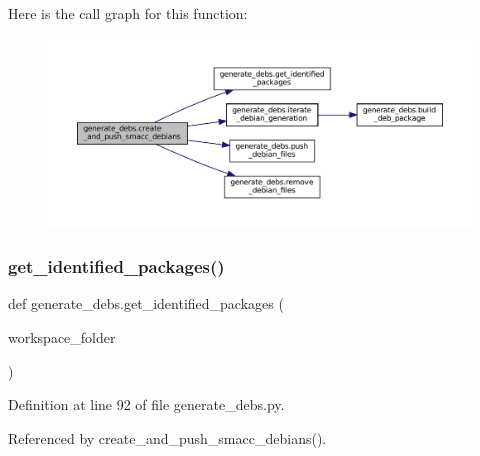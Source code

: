 Here is the call graph for this function\+:
\nopagebreak
\begin{figure}[H]
\begin{center}
\leavevmode
\includegraphics[width=350pt]{namespacegenerate__debs_af7237c463c8e5b4df369e6befc154c50_cgraph}
\end{center}
\end{figure}
\mbox{\label{namespacegenerate__debs_aa91b87c6d9c3ed04015845cc9298431a}} 
\subsubsection{\texorpdfstring{get\+\_\+identified\+\_\+packages()}{get\_identified\_packages()}}
{\footnotesize\ttfamily def generate\+\_\+debs.\+get\+\_\+identified\+\_\+packages (\begin{DoxyParamCaption}\item[{}]{workspace\+\_\+folder }\end{DoxyParamCaption})}



Definition at line 92 of file generate\+\_\+debs.\+py.



Referenced by create\+\_\+and\+\_\+push\+\_\+smacc\+\_\+debians().


